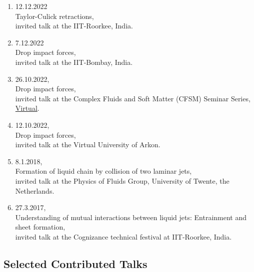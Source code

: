 \documentclass[11pt,a4paper,roman,english,colorlinks,linkcolor={red!50!black}]{moderncv}
\begin{document}
\begin{enumerate}[leftmargin=0.75cm]
	\item 12.12.2022\\
	Taylor-Culick retractions,\\
	invited talk at the IIT-Roorkee, India.

	\item 7.12.2022\\
	Drop impact forces,\\
	invited talk at the IIT-Bombay, India.

	\item 26.10.2022,\\
	Drop impact forces,\\
	invited talk at the Complex Fluids and Soft Matter (CFSM) Seminar Series, \href{https://youtu.be/enTMAucwUDs}{Virtual}.

	\item 12.10.2022,\\
	Drop impact forces,\\
	invited talk at the Virtual University of Arkon.

	\item 8.1.2018,\\
	Formation of liquid chain by collision of two laminar jets,\\
	invited talk at the Physics of Fluids Group, University of Twente, the Netherlands.

	\item 27.3.2017,\\
	Understanding of mutual interactions between liquid jets: Entrainment and sheet formation,\\
	invited talk at the Cognizance technical festival at IIT-Roorkee, India.
\end{enumerate}

\subsection{\hspace*{-1.8cm}Selected Contributed Talks}
\end{document}
